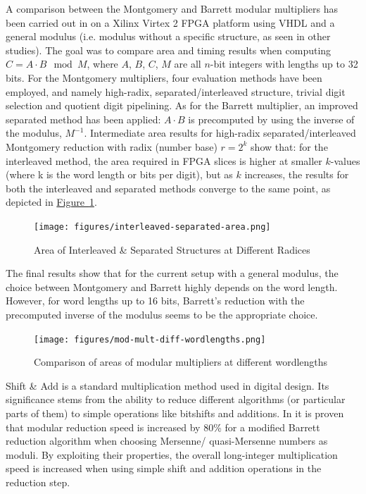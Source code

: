 \documentclass[11pt,
  titlepage=false,
  abstract=on,
]{scrreprt}
\begin{document}
A comparison between the Montgomery and Barrett modular multipliers has been carried out in \cite{kong2006comparison} on a Xilinx Virtex 2 FPGA platform using VHDL and a general modulus
(i.e. modulus without a specific structure, as seen in other studies).
The goal was to compare area and timing results when computing $C = A \cdot B \mod M$, where $A$, $B$, $C$, $M$ are all $n$-bit integers with lengths up to 32 bits.
For the Montgomery multipliers, four evaluation methods have been employed, and namely high-radix, separated/interleaved structure, trivial digit selection and quotient digit pipelining.
As for the Barrett multiplier, an improved separated method has been applied: $A \cdot B$ is precomputed by using the inverse of the modulus, $M^{-1}$.
Intermediate area results for high-radix separated/interleaved Montgomery reduction with radix (number base) $r = 2^{k}$ show that: for the interleaved  method, the area required in FPGA slices is higher
at smaller $k$-values (where k is the word length or bits per digit), but as $k$ increases, the results for both the interleaved and separated methods converge to the same point, as depicted in \hyperref[fig:interleaved-separated-area]{Figure~\ref{fig:interleaved-separated-area}}.

\begin{figure}[h]
  \centering
  \texttt{[image: figures/interleaved-separated-area.png]}
  \caption{Area of Interleaved \& Separated Structures at Different Radices \cite{kong2006comparison}}
  \label{fig:interleaved-separated-area}
\end{figure}

The final results show that  for the current setup with a general modulus, the choice between Montgomery and Barrett highly depends on the word length. However, for word lengths up to 16 bits,
Barrett's reduction with the precomputed inverse of the modulus seems to be the appropriate choice.

\begin{figure}[h]
  \centering
  \texttt{[image: figures/mod-mult-diff-wordlengths.png]}
  \caption{Comparison of areas of modular multipliers at different wordlengths \cite{kong2006comparison}}
  \label{fig:mod-mult-diff-wordlengths}
\end{figure}

Shift \& Add is a standard multiplication method used in digital design. Its significance stems from the ability to reduce different algorithms (or particular parts of them) to simple operations
like bitshifts and additions. In \cite{sreehari2012application} it is proven that modular reduction speed is increased by $80$\% for a modified Barrett reduction algorithm when choosing Mersenne/ quasi-Mersenne numbers as moduli.
By exploiting their properties, the overall long-integer multiplication speed is increased when using simple shift and addition operations in the reduction step.  
\end{document}
